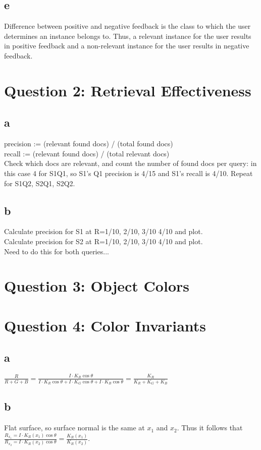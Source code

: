 \documentclass[a4paper,11pt]{article}
\newcommand{\ds}{\displaystyle}
\begin{document}
	\subsection*{e}
		Difference between positive and negative feedback is the class to which the user
		determines an instance belongs to. Thus, a relevant instance for the user results
		in positive feedback and a non-relevant instance  for the user results in negative
		feedback.

	\section*{Question 2: Retrieval Effectiveness}
		\subsection*{a}
			precision := (relevant found docs) / (total found docs)\\
			recall := (relevant found docs) / (total relevant docs)\\
			Check which docs are relevant, and count the number of found docs per query: in
			this case 4 for S1Q1, so S1's Q1 precision is 4/15 and S1's recall is 4/10. Repeat
			for S1Q2, S2Q1, S2Q2.
		\subsection*{b}
			Calculate precision for S1 at R=1/10, 2/10, 3/10 4/10 and plot.\\
			Calculate precision for S2 at R=1/10, 2/10, 3/10 4/10 and plot.\\
			Need to do this for both queries...

	\section*{Question 3: Object Colors}

	\section*{Question 4: Color Invariants}
		\subsection*{a}
			$\ds\frac{R}{R + G + B} = \ds\frac{I \cdot K_R \cos \theta}{I \cdot K_R \cos \theta + I \cdot K_G \cos \theta + I \cdot K_B \cos \theta} = \ds\frac{K_R}{K_R + K_G + K_B}$

		\subsection*{b}
			Flat surface, so surface normal is the same at $x_1$ and $x_2$. Thus it follows that
			$\ds\frac{R_{x_1} = I \cdot K_R(x_1) \cos \theta}{R_{x_2} = I \cdot K_R(x_2) \cos \theta} = \ds\frac{K_R(x_1)}{K_R(x_2)}$.
\end{document}
